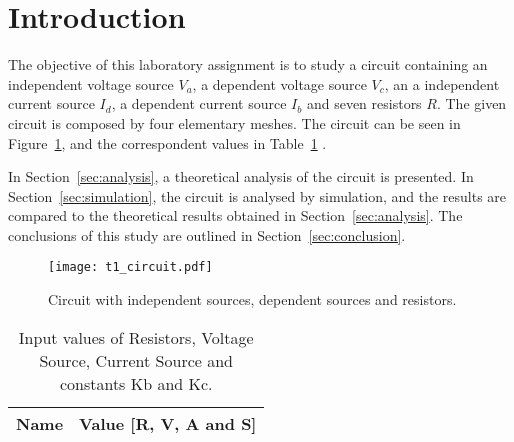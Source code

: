 \section{Introduction}
\label{sec:introduction}

The objective of this laboratory assignment is to study a circuit containing an independent voltage source $V_a$, a dependent voltage source $V_c$, an a independent current source $I_d$, a dependent current source $I_b$ and seven resistors $R$. The given circuit is composed by four elementary meshes. The circuit can be seen in Figure~\ref{fig:t1_circuit}, and the correspondent values in Table~\ref{tab:input_values} .

In Section~\ref{sec:analysis}, a theoretical analysis of the circuit is
presented. In Section~\ref{sec:simulation}, the circuit is analysed by
simulation, and the results are compared to the theoretical results obtained in
Section~\ref{sec:analysis}. The conclusions of this study are outlined in
Section~\ref{sec:conclusion}.

\begin{figure}[h] \centering
\texttt{[image: t1\_circuit.pdf]}
\caption{Circuit with independent sources, dependent sources and resistors.}
\label{fig:t1_circuit}
\end{figure}

\begin{table}[h]
  \centering
  \begin{tabular}{|l|r|}
    \hline    
    {\bf Name} & {\bf Value [R, V, A and S]} \\ \hline
    
  \end{tabular}
  \caption{Input values of Resistors, Voltage Source, Current Source and constants Kb and Kc.}
  \label{tab:input_values}
\end{table}


